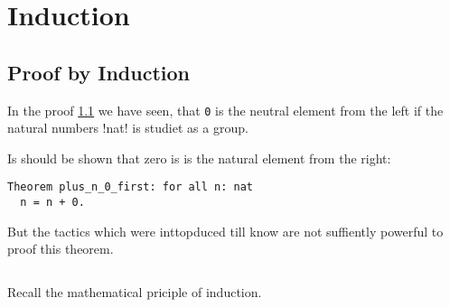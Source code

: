\section{Induction}

\subsection{Proof by Induction}
In the proof \ref{} we have seen, 
that \lstinline!0! is the neutral element from the left if the natural numbers \lstlisting!nat! is studiet as a group. 

Is should be shown that zero is is the natural element from the right:
\begin{lstlisting}
Theorem plus_n_0_first: for all n: nat
  n = n + 0.  
\end{lstlisting}

But the tactics which were inttopduced till know are not suffiently powerful to proof this theorem.

\begin{lstlisting}

\end{lstlisting}

Recall the mathematical priciple of induction.